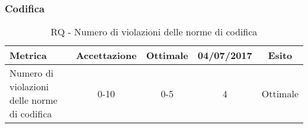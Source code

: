 \documentclass[../PianoDiQualifica.tex]{subfiles}
\begin{document}
				\subsubsection{Codifica}	\begin{table}[H]
					\center
					\begin{tabular}{|>{\centering}p{6cm}|c|c|c|c|}
						\hline
						\rowcolor{blue!30}\textbf{Metrica} & \textbf{Accettazione} & \textbf{Ottimale}&\textbf{04/07/2017}&\textbf{Esito} \\ \hline
						Numero di violazioni delle norme di codifica & 0-10 & 0-5 & 4 & Ottimale\\ \hline
						\end{tabular}
					\caption{RQ - Numero di violazioni delle norme di codifica}
					\end{table}
\end{document}
